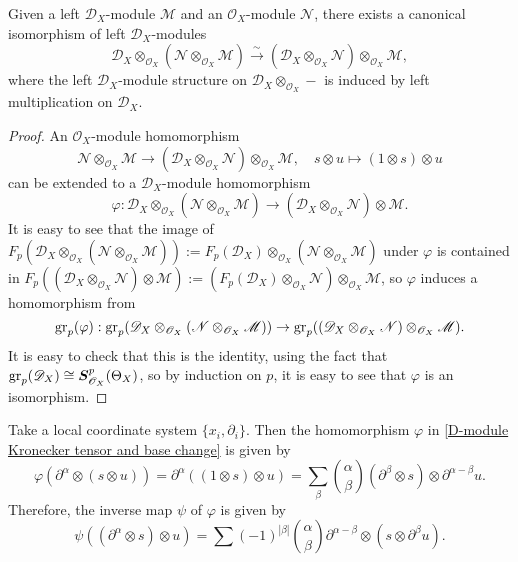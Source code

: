 \begin{proposition}\label{D-module Kronecker tensor and base change}
Given a left $\mathscr{D}_X$-module $\mathscr{M}$ and an $\mathscr{O}_X$-module $\mathscr{N}$, there exists a canonical isomorphism of left $\mathscr{D}_X$-modules
\[\mathscr{D}_X\otimes_{\mathscr{O}_X}(\mathscr{N}\otimes_{\mathscr{O}_X}\mathscr{M})\stackrel{\sim}{\to} (\mathscr{D}_X\otimes_{\mathscr{O}_X}\mathscr{N})\otimes_{\mathscr{O}_X}\mathscr{M},\]
where the left $\mathscr{D}_X$-module structure on $\mathscr{D}_X\otimes_{\mathscr{O}_X}-$ is induced by left multiplication on $\mathscr{D}_X$.
\end{proposition}
\begin{proof}
An $\mathscr{O}_X$-module homomorphism
\[\mathscr{N}\otimes_{\mathscr{O}_X}\mathscr{M}\to (\mathscr{D}_X\otimes_{\mathscr{O}_X}\mathscr{N})\otimes_{\mathscr{O}_X}\mathscr{M},\quad s\otimes u \mapsto (1\otimes s)\otimes u\]
can be extended to a $\mathscr{D}_X$-module homomorphism
\[\varphi:\mathscr{D}_X\otimes_{\mathscr{O}_X}(\mathscr{N}\otimes_{\mathscr{O}_X}\mathscr{M})\to (\mathscr{D}_X\otimes_{\mathscr{O}_X}\mathscr{N})\otimes\mathscr{M}.\]
It is easy to see that the image of $F_p(\mathscr{D}_X\otimes_{\mathscr{O}_X}(\mathscr{N}\otimes_{\mathscr{O}_X}\mathscr{M})):=F_p(\mathscr{D}_X)\otimes_{\mathscr{O}_X}(\mathscr{N}\otimes_{\mathscr{O}_X}\mathscr{M})$ under $\varphi$ is contained in $F_p((\mathscr{D}_X\otimes_{\mathscr{O}_X}\mathscr{N})\otimes\mathscr{M}):=(F_p(\mathscr{D}_X)\otimes_{\mathscr{O}_X}\mathscr{N})\otimes_{\mathscr{O}_X}\mathscr{M}$, so $\varphi$ induces a homomorphism from
\[\mathrm{gr}_p(\varphi):\mathrm{gr}_p(\mathscr{D}_X\otimes_{\mathscr{O}_X}(\mathscr{N}\otimes_{\mathscr{O}_X}\mathscr{M}))\to \mathrm{gr}_p((\mathscr{D}_X\otimes_{\mathscr{O}_X}\mathscr{N})\otimes_{\mathscr{O}_X}\mathscr{M}).\]
It is easy to check that this is the identity, using the fact that $\mathrm{gr}_p(\mathscr{D}_X)\cong\bm{S}_{\mathscr{O}_X}^p(\Theta_X)$, so by induction on $p$, it is easy to see that $\varphi$ is an isomorphism.
\end{proof}

\begin{remark}
Take a local coordinate system $\{x_i,\partial_i\}$. Then the homomorphism $\varphi$ in \cref{D-module Kronecker tensor and base change} is given by
\[\varphi(\partial^\alpha\otimes(s\otimes u))=\partial^\alpha((1\otimes s)\otimes u)=\sum_{\beta}\binom{\alpha}{\beta}(\partial^\beta\otimes s)\otimes\partial^{\alpha-\beta}u.\]
Therefore, the inverse map $\psi$ of $\varphi$ is given by
\[\psi((\partial^\alpha\otimes s)\otimes u)=\sum(-1)^{|\beta|}\binom{\alpha}{\beta}\partial^{\alpha-\beta}\otimes (s\otimes\partial^\beta u).\]
\end{remark}

